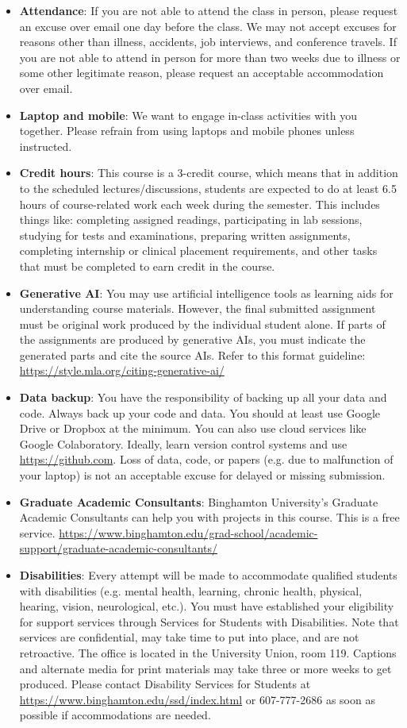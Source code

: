 \documentclass[11pt, a4paper]{article}
\begin{document}
\begin{itemize}
    \item \textbf{Attendance}: If you are not able to attend the class in person, please request an excuse over email one day before the class. We may not accept excuses for reasons other than illness, accidents, job interviews, and conference travels. If you are not able to attend in person for more than two weeks due to illness or some other legitimate reason, please request an acceptable accommodation over email.
    \item \textbf{Laptop and mobile}: We want to engage in-class activities with you together. Please refrain from using laptops and mobile phones unless instructed.
    \item \textbf{Credit hours}: This course is a 3-credit course, which means that in addition to the scheduled lectures/discussions, students are expected to do at least 6.5 hours of course-related work each week during the semester. This includes things like: completing assigned readings, participating in lab sessions, studying for tests and examinations, preparing written assignments, completing internship or clinical placement requirements, and other tasks that must be completed to earn credit in the course.
    \item \textbf{Generative AI}: You may use artificial intelligence tools as learning aids for understanding course materials. However, the final submitted assignment must be original work produced by the individual student alone. If parts of the assignments are produced by generative AIs, you must indicate the generated parts and cite the source AIs. Refer to this format guideline: \url{https://style.mla.org/citing-generative-ai/}
    \item \textbf{Data backup}: You have the responsibility of backing up all your data and code. Always back up your code and data. You should at least use Google Drive or Dropbox at the minimum. You can also use cloud services like Google Colaboratory. Ideally, learn version control systems and use \url{https://github.com}. Loss of data, code, or papers (e.g. due to malfunction of your laptop) is not an acceptable excuse for delayed or missing submission.
    \item \textbf{Graduate Academic Consultants}: Binghamton University's Graduate Academic Consultants can help you with projects in this course. This is a free service. \url{https://www.binghamton.edu/grad-school/academic-support/graduate-academic-consultants/}
    \item \textbf{Disabilities}: Every attempt will be made to accommodate qualified students with disabilities (e.g. mental health, learning, chronic health, physical, hearing, vision, neurological, etc.). You must have established your eligibility for support services through Services for Students with Disabilities. Note that services are confidential, may take time to put into place, and are not retroactive. The office is located in the University Union, room 119. Captions and alternate media for print materials may take three or more weeks to get produced. Please contact Disability Services for Students at \url{https://www.binghamton.edu/ssd/index.html} or 607-777-2686 as soon as possible if accommodations are needed.

\end{itemize}
\end{document}
